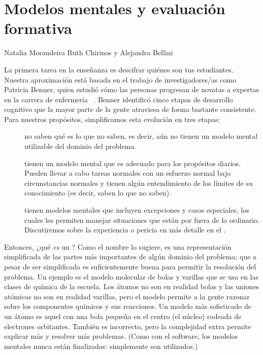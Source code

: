 \chapter{Modelos mentales y evaluación formativa}\label{s:models}

\begin{reviewer}
{Natalia Morandeira}
{Ruth Chirinos y Alejandra Bellini}
\end{reviewer}

La primera tarea en la enseñanza es descifrar quiénes son tus estudiantes.
Nuestra aproximación está basada en el trabajo de investigadores/as como Patricia Benner,
quien estudió cómo las personas progresan de novatas a expertas en la carrera de enfermería ~\cite{Benn2000}.
Benner identificó cinco etapas de desarrollo cognitivo que la mayor parte de la gente atraviesa de forma bastante consistente.
Para nuestros propósitos, simplificamos esta evolución en tres etapas:

\begin{description}

\item[]
no saben qué es lo que no saben,
es decir, aún no tienen un modelo mental utilizable del dominio del problema.  

\item[]
tienen un modelo mental que es adecuado para los propósitos diarios.
Pueden llevar a cabo tareas normales con un esfuerzo normal bajo circunstancias normales
y tienen algún entendimiento de los límites de su conocimiento
(es decir, saben lo que no saben).

\item[]
  tienen modelos mentales que incluyen excepciones y casos especiales,
  los cuales les permiten manejar situaciones que están por fuera de lo ordinario.
Discutiremos sobre la experiencia o pericia en más detalle en el .

\end{description}

Entonces, ¿qué \emph{es} un ?
Como el nombre lo sugiere,
es una representación simplificada de las partes más importantes de algún dominio del problema;
que a pesar de ser simplificada es suficientemente buena para permitir la resolución del problema.
Un ejemplo es el modelo molecular de bolas y varillas que se usa en las clases de química de la escuela.
Los átomos no son en realidad bolas
y las uniones atómicas no son en realidad varillas,
pero el modelo permite a la gente razonar sobre los componentes químicos y sus reacciones.
Un modelo más sofisticado de un átomo es aquel con una bola pequeña en el centro (el núcleo) rodeada de electrones orbitantes. 
También es incorrecto,
pero la complejidad extra permite explicar más y resolver más problemas.
(Como con el software, 
los modelos mentales nunca están finalizados:
simplemente son utilizados.)

